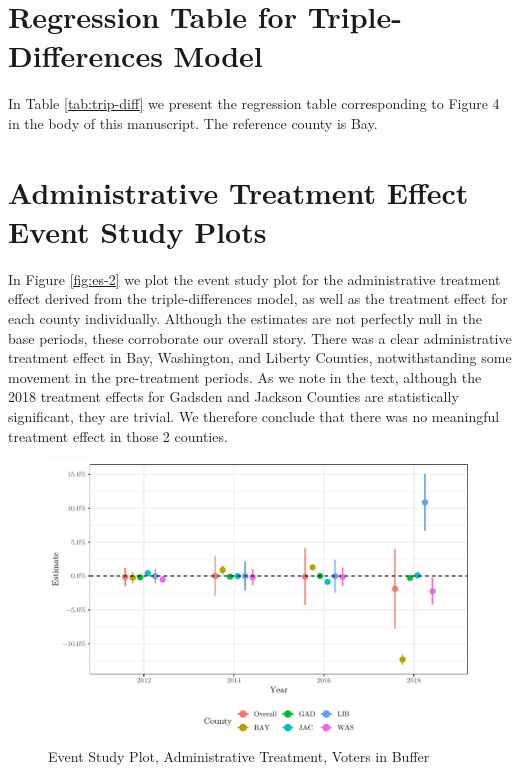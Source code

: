 \documentclass[
  12pt,
]{article}
\begin{document}
\hypertarget{regression-table-for-triple-differences-model}{%
\section*{Regression Table for Triple-Differences Model}\label{regression-table-for-triple-differences-model}}

In Table \ref{tab:trip-diff} we present the regression table corresponding to Figure 4 in the body of this manuscript. The reference county is Bay.

\begin{singlespace}

\end{singlespace}

\hypertarget{administrative-treatment-effect-event-study-plots}{%
\section*{Administrative Treatment Effect Event Study Plots}\label{administrative-treatment-effect-event-study-plots}}

In Figure \ref{fig:es-2} we plot the event study plot for the administrative treatment effect derived from the triple-differences model, as well as the treatment effect for each county individually. Although the estimates are not perfectly null in the base periods, these corroborate our overall story. There was a clear administrative treatment effect in Bay, Washington, and Liberty Counties, notwithstanding some movement in the pre-treatment periods. As we note in the text, although the 2018 treatment effects for Gadsden and Jackson Counties are statistically significant, they are trivial. We therefore conclude that there was no meaningful treatment effect in those 2 counties.

\begin{figure}[H]

{\centering \includegraphics{si_files/figure-latex/es2-1} 

}

\caption{\label{fig:es-2}Event Study Plot, Administrative Treatment, Voters in Buffer}\label{fig:es2}
\end{figure}
\end{document}
